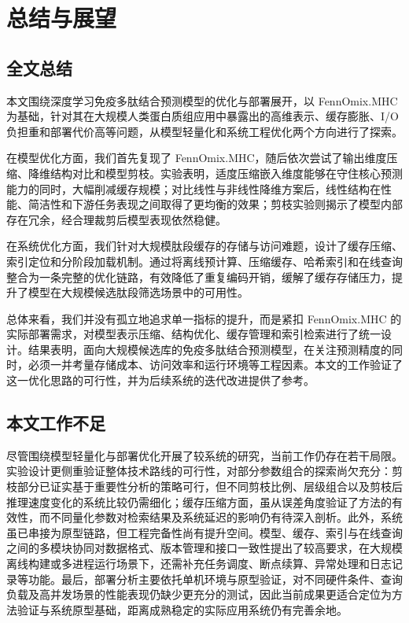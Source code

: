 \chapter{总结与展望}

\section{全文总结}

本文围绕深度学习免疫多肽结合预测模型的优化与部署展开，以 FennOmix.MHC 为基础，针对其在大规模人类蛋白质组应用中暴露出的高维表示、缓存膨胀、I/O 负担重和部署代价高等问题，从模型轻量化和系统工程优化两个方向进行了探索。

在模型优化方面，我们首先复现了 FennOmix.MHC，随后依次尝试了输出维度压缩、降维结构对比和模型剪枝。实验表明，适度压缩嵌入维度能够在守住核心预测能力的同时，大幅削减缓存规模；对比线性与非线性降维方案后，线性结构在性能、简洁性和下游任务表现之间取得了更均衡的效果；剪枝实验则揭示了模型内部存在冗余，经合理裁剪后模型表现依然稳健。

在系统优化方面，我们针对大规模肽段缓存的存储与访问难题，设计了缓存压缩、索引定位和分阶段加载机制。通过将离线预计算、压缩缓存、哈希索引和在线查询整合为一条完整的优化链路，有效降低了重复编码开销，缓解了缓存存储压力，提升了模型在大规模候选肽段筛选场景中的可用性。

总体来看，我们并没有孤立地追求单一指标的提升，而是紧扣 FennOmix.MHC 的实际部署需求，对模型表示压缩、结构优化、缓存管理和索引检索进行了统一设计。结果表明，面向大规模候选库的免疫多肽结合预测模型，在关注预测精度的同时，必须一并考量存储成本、访问效率和运行环境等工程因素。本文的工作验证了这一优化思路的可行性，并为后续系统的迭代改进提供了参考。

\section{本文工作不足}

尽管围绕模型轻量化与部署优化开展了较系统的研究，当前工作仍存在若干局限。实验设计更侧重验证整体技术路线的可行性，对部分参数组合的探索尚欠充分：剪枝部分已证实基于重要性分析的策略可行，但不同剪枝比例、层级组合以及剪枝后推理速度变化的系统比较仍需细化；缓存压缩方面，虽从误差角度验证了方法的有效性，而不同量化参数对检索结果及系统延迟的影响仍有待深入剖析。此外，系统虽已串接为原型链路，但工程完备性尚有提升空间。模型、缓存、索引与在线查询之间的多模块协同对数据格式、版本管理和接口一致性提出了较高要求，在大规模离线构建或多进程运行场景下，还需补充任务调度、断点续算、异常处理和日志记录等功能。最后，部署分析主要依托单机环境与原型验证，对不同硬件条件、查询负载及高并发场景的性能表现仍缺少更充分的测试，因此当前成果更适合定位为方法验证与系统原型基础，距离成熟稳定的实际应用系统仍有完善余地。

